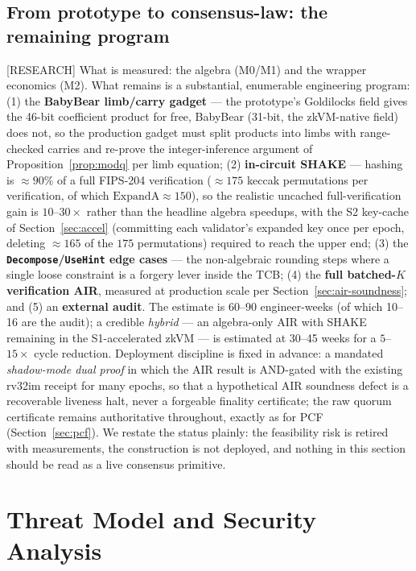 \documentclass[11pt]{article}
\newcommand{\code}[1]{\texttt{#1}}
\newcommand{\statusR}{\textcolor{statred}{\textsf{\scriptsize[RESEARCH]}}}
\theoremstyle{plain}
\theoremstyle{definition}
\theoremstyle{remark}
\begin{document}
\subsection{From prototype to consensus-law: the remaining program}
\label{sec:air-program}

\statusR{} What is measured: the algebra (M0/M1) and the wrapper economics
(M2). What remains is a substantial, enumerable engineering program:
(1) the \textbf{BabyBear limb/carry gadget} --- the prototype's Goldilocks
field gives the 46-bit coefficient product for free, BabyBear (31-bit, the
zkVM-native field) does not, so the production gadget must split products
into limbs with range-checked carries and re-prove the integer-inference
argument of Proposition~\ref{prop:modq} per limb equation; (2)
\textbf{in-circuit SHAKE} --- hashing is $\approx 90\%$ of a full FIPS-204
verification ($\approx 175$ keccak permutations per verification, of which
$\mathrm{ExpandA} \approx 150$), so the realistic uncached full-verification
gain is $10$--$30\times$ rather than the headline algebra speedups, with the
S2 key-cache of Section~\ref{sec:accel} (committing each validator's
expanded key once per epoch, deleting $\approx 165$ of the $175$
permutations) required to reach the upper end; (3) the
\textbf{\code{Decompose}/\code{UseHint} edge cases} --- the non-algebraic
rounding steps where a single loose constraint is a forgery lever inside
the TCB; (4) the \textbf{full batched-$K$ verification AIR}, measured at
production scale per Section~\ref{sec:air-soundness}; and (5) an
\textbf{external audit}. The estimate is 60--90 engineer-weeks (of which
10--16 are the audit); a credible \emph{hybrid} --- an algebra-only AIR
with SHAKE remaining in the S1-accelerated zkVM --- is estimated at 30--45
weeks for a $5$--$15\times$ cycle reduction. Deployment discipline is fixed
in advance: a mandated \emph{shadow-mode dual proof} in which the AIR
result is AND-gated with the existing rv32im receipt for many epochs, so
that a hypothetical AIR soundness defect is a recoverable liveness halt,
never a forgeable finality certificate; the raw quorum certificate remains
authoritative throughout, exactly as for PCF (Section~\ref{sec:pcf}). We
restate the status plainly: the feasibility risk is retired with
measurements, the construction is not deployed, and nothing in this section
should be read as a live consensus primitive.

\section{Threat Model and Security Analysis}
\label{sec:security}
\end{document}
